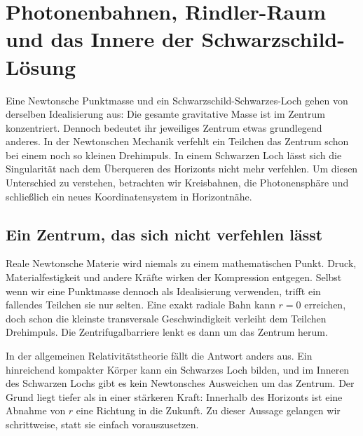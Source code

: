\chapter{Photonenbahnen, Rindler-Raum und das Innere der Schwarzschild-Lösung}

Eine Newtonsche Punktmasse und ein Schwarzschild-Schwarzes-Loch gehen von derselben Idealisierung aus: Die gesamte gravitative Masse ist im Zentrum konzentriert. Dennoch bedeutet ihr jeweiliges Zentrum etwas grundlegend anderes. In der Newtonschen Mechanik verfehlt ein Teilchen das Zentrum schon bei einem noch so kleinen Drehimpuls. In einem Schwarzen Loch lässt sich die Singularität nach dem Überqueren des Horizonts nicht mehr verfehlen. Um diesen Unterschied zu verstehen, betrachten wir Kreisbahnen, die Photonensphäre und schließlich ein neues Koordinatensystem in Horizontnähe.

\section{Ein Zentrum, das sich nicht verfehlen lässt}

Reale Newtonsche Materie wird niemals zu einem mathematischen Punkt. Druck, Materialfestigkeit und andere Kräfte wirken der Kompression entgegen. Selbst wenn wir eine Punktmasse dennoch als Idealisierung verwenden, trifft ein fallendes Teilchen sie nur selten. Eine exakt radiale Bahn kann \(r=0\) erreichen, doch schon die kleinste transversale Geschwindigkeit verleiht dem Teilchen Drehimpuls. Die Zentrifugalbarriere lenkt es dann um das Zentrum herum.

In der allgemeinen Relativitätstheorie fällt die Antwort anders aus. Ein hinreichend kompakter Körper kann ein Schwarzes Loch bilden, und im Inneren des Schwarzen Lochs gibt es kein Newtonsches Ausweichen um das Zentrum. Der Grund liegt tiefer als in einer stärkeren Kraft: Innerhalb des Horizonts ist eine Abnahme von \(r\) eine Richtung in die Zukunft. Zu dieser Aussage gelangen wir schrittweise, statt sie einfach vorauszusetzen.

\begin{classroomqa}
\end{classroomqa}

